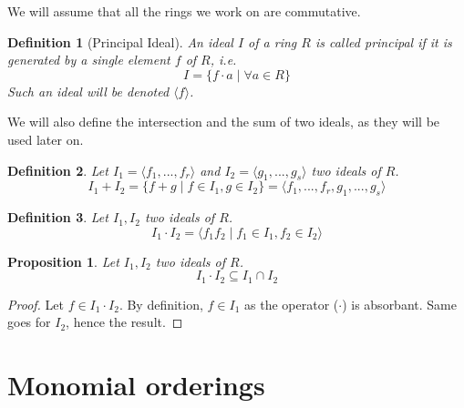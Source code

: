 \documentclass{article}
\newtheorem{definition}{Definition}[section]
\newtheorem{proposition}{Proposition}[section]
\begin{document}
We will assume that all the rings we work on are commutative. 

\begin{definition}[Principal Ideal]
    An ideal $I$ of a ring $R$ is called principal if it is generated by a single element $f$ of $R$, \textit{i.e.}
    \begin{displaymath}
        I = \{f \cdot a \mid \forall a \in R\}
    \end{displaymath}
    Such an ideal will be denoted $\langle f \rangle$.
\end{definition}

We will also define the intersection and the sum of two ideals, as they will be used later on.


\begin{definition}
    Let $I_{1} = \langle f_{1}, ..., f_{r} \rangle$ and  $I_{2} = \langle g_{1}, ..., g_{s} \rangle $ two ideals of $R$. 
    \begin{displaymath}
        I_{1} + I_{2} = \{f + g \mid f \in I_{1}, g \in I_{2}\} = \langle f_{1}, ..., f_{r}, g_{1}, ..., g_{s} \rangle 
    \end{displaymath}
\end{definition}

\begin{definition}
    Let $I_{1}, I_{2}$ two ideals of $R$. 
    \begin{displaymath}
        I_{1} \cdot I_{2} = \langle f_{1}f_{2} \mid f_{1} \in I_{1}, f_{2} \in I_{2} \rangle
    \end{displaymath}
\end{definition}

\begin{proposition}
    Let $I_{1}, I_{2}$ two ideals of $R$. 
    \begin{displaymath}
        I_{1} \cdot I_{2} \subseteq I_{1} \cap I_{2}
    \end{displaymath}
\end{proposition}

\begin{proof}
    Let $f \in I_{1} \cdot I_{2}$. By definition, $f \in I_{1}$ as the operator ($\cdot$) is absorbant. Same goes for $I_{2}$, hence the result.
\end{proof}

\section{Monomial orderings}
\end{document}
